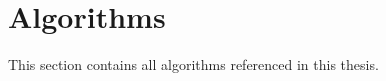 \section*{Algorithms}\label{algorithmsAppendix}
This section contains all algorithms referenced in this thesis.

\pagebreak

